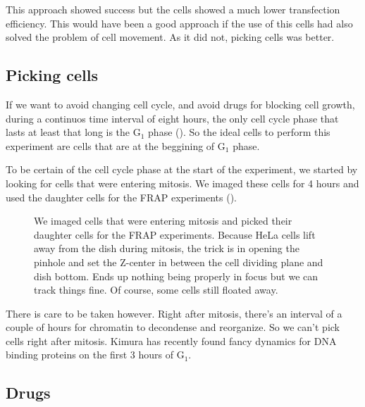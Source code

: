     This approach showed success but the cells showed a much lower transfection efficiency. This
    would have been a good approach if the use of this cells had also solved the problem of cell
    movement. As it did not, picking cells was better.

  \subsection{Picking cells}
  
    If we want to avoid changing cell cycle, and avoid drugs for blocking cell growth, during a
    continuos time interval of eight hours, the only cell cycle phase that lasts at least that
    long is the G$_1$ phase (). So the ideal cells to perform this
    experiment are cells that are at the beggining of G$_1$ phase.
    
    To be certain of the cell cycle phase at the start of the experiment, we started by looking for
    cells that were entering mitosis. We imaged these cells for 4 hours and used the daughter cells
    for the FRAP experiments ().
    
    \begin{figure}
      \centering
                   {We imaged cells that were entering mitosis and picked their
                    daughter cells for the FRAP experiments. Because HeLa cells lift
                    away from the dish during mitosis, the trick is in opening the
                    pinhole and set the Z-center in between the cell dividing plane
                    and dish bottom. Ends up nothing being properly in focus but we
                    can track things fine. Of course, some cells still floated away.}
      \label{fig:picking-cells}
    \end{figure}
    
    There is care to be taken however. Right after mitosis, there's an interval of a couple of
    hours for chromatin to decondense and reorganize. So we can't pick cells right after mitosis.
    Kimura has recently found fancy dynamics for DNA binding proteins  on the first 3 hours of G$_1$.
    

  \subsection{Drugs}
  
